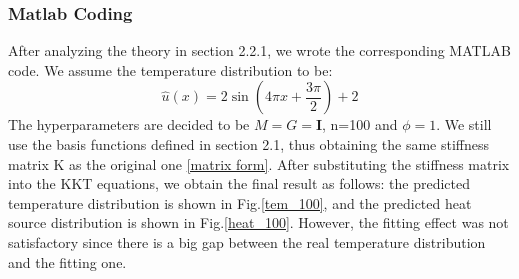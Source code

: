 \documentclass{article}
\begin{document}
    \subsubsection{Matlab Coding}
    After analyzing the theory in section 2.2.1, we wrote the corresponding MATLAB code. We assume the temperature distribution to be:
    \begin{equation}
    \hat{u}(x)=2\sin(4\pi x+\frac{3\pi}{2})+2
    \end{equation}
    The hyperparameters are decided to be $M=G=\mathbf{I}$, n=100 and $\phi=1$. We still use the basis functions defined in section 2.1, thus obtaining the same stiffness matrix K as the original one \ref{matrix form}. After substituting the stiffness matrix into the KKT equations, we obtain the final result as follows: the predicted temperature distribution is shown in Fig.\ref{tem_100}, and the predicted heat source distribution is shown in Fig.\ref{heat_100}. However, the fitting effect was not satisfactory since there is a big gap between the real temperature distribution and the fitting one.
\end{document}
